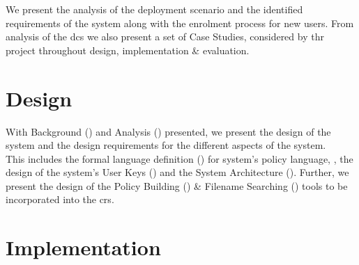 \documentclass[british]{l4proj}
\begin{document}
We present the analysis of the deployment scenario and the identified requirements of the \theResServer system along with the enrolment process for new users. From analysis of the \acrfull{dcs} we also present a set of Case Studies, considered by thr project throughout design, implementation \& evaluation.









\chapter{Design}
\label{ch:design}

With Background () and Analysis () presented, we present the design of the \theResServer system and the design requirements for the different aspects of the system.\\
This includes the formal language definition () for \theResServer system's policy language, \thePolicyLang, the design of the system's User Keys () and the System Architecture (). Further, we present the design of the Policy Building () \& Filename Searching () tools to be incorporated into the \acrfull{crs}.















\chapter{Implementation}
\label{ch:implementation}
\end{document}
